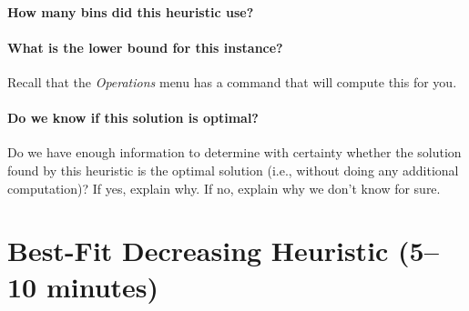 \documentclass[11pt,letterpaper]{article}
\begin{document}
\vspace*{-0.25in}

\paragraph*{How many bins did this heuristic use?}

\vspace*{0.25in}

\paragraph*{What is the lower bound for this instance?} Recall that the
{\em Operations} menu has a command that will compute this for you.

\vspace*{0.25in}

\paragraph*{Do we know if this solution is optimal?} Do we have enough 
information to determine with certainty whether the solution found by
this heuristic is the optimal solution (i.e., without doing any additional
computation)? If yes, explain why. If no, explain why we don't know for sure.

\vspace*{0.5in}



\section{Best-Fit Decreasing Heuristic (5--10 minutes)}\label{sec:bfd}

\end{document}
